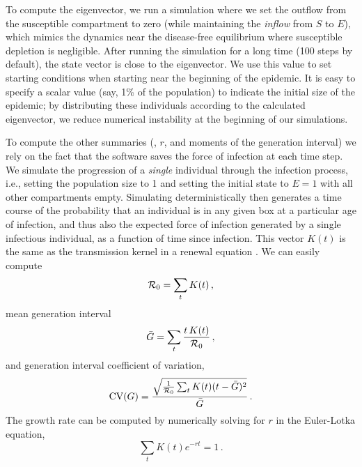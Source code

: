 \documentclass[12pt]{article}\usepackage[]{graphicx}\usepackage[]{color}
\begin{document}
To compute the eigenvector, we run a simulation where we set the outflow from the susceptible compartment to zero (while maintaining the \emph{inflow} from $S$ to $E$), which mimics the dynamics near the disease-free equilibrium where susceptible depletion is negligible. After running the simulation for a long time (100 steps by default), the state vector is close to the eigenvector.  
We use this value to set starting conditions when starting near the beginning of the epidemic. 
It is easy to specify a scalar value (say, 1\% of the population) to indicate the initial size of the epidemic; by distributing these individuals according to the calculated eigenvector, we reduce numerical instability at the beginning of our simulations. 

To compute the other summaries (\Rzero, $r$, and moments of the generation interval) we rely on the fact that the software saves the force of infection at each time step. 
We simulate the progression of a \emph{single} individual through the infection process, i.e., setting the population size to 1 and setting the initial state to $E=1$ with all other compartments empty. 
Simulating deterministically then generates a time course of the probability that an individual is in any given box at a particular age of infection, and thus also the expected force of infection generated by a single infectious individual, as a function of time since infection. 
This vector $K(t)$ is the same as the transmission kernel in a renewal equation \cite{Cham+18}. 
We can easily compute 
\begin{equation}\label{eq:Rzero}
{\mathcal R}_0 = \sum_t K(t) \,, 
\end{equation}
mean generation interval  
\begin{equation}\label{eq:Gbar}
\bar G = \sum_t \frac{t\,K(t)}{{\mathcal R}_0} \,, 
\end{equation}
and generation interval coefficient of variation,
\begin{equation}\label{eq:GCV}
\textrm{CV}(G) = \frac{\sqrt{\frac{1}{{\mathcal R}_0}\sum_t K(t) (t- \bar G)^2}}{\bar G} \,.
\end{equation}
The growth rate can be computed by numerically solving for $r$ in the Euler-Lotka equation,
\begin{equation}\label{eq:Euler-Lotka}
\sum_t  K(t) e^{-r t} = 1 \,.
\end{equation}

\end{document}
